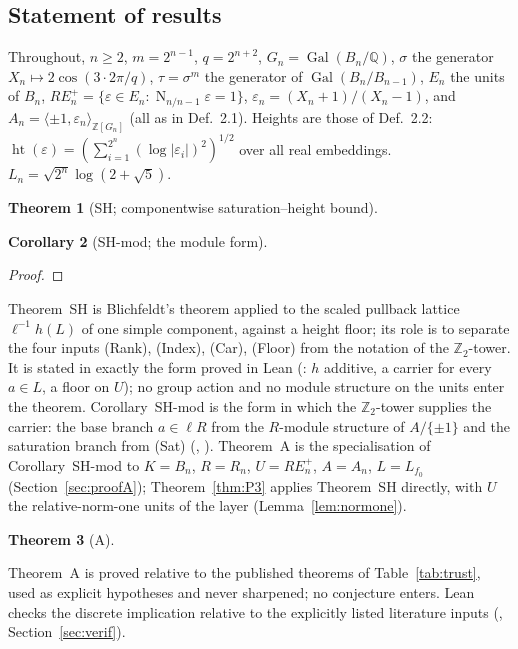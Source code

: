 \documentclass[11pt]{amsart}
\newtheorem{theorem}{Theorem}[section]
\newtheorem{corollary}[theorem]{Corollary}
\theoremstyle{remark}\newtheorem{remark}[theorem]{Remark}
\theoremstyle{definition}\newtheorem{definition}[theorem]{Definition}
\newcommand{\Q}{\mathbb{Q}}\newcommand{\Z}{\mathbb{Z}}\newcommand{\R}{\mathbb{R}}\newcommand{\F}{\mathbb{F}}
\newcommand{\RE}{RE^{+}_n}\newcommand{\ord}{\operatorname{ord}}\newcommand{\hgt}{\operatorname{ht}}
\newcommand{\Nr}{\operatorname{N}_{n/n-1}}\newcommand{\covol}{\operatorname{covol}}
\providecommand{\proofsdir}{../../proofs} %
\begin{document}
\subsection{Statement of results}\label{sec:results}
Throughout, $n\ge2$, $m=2^{n-1}$, $q=2^{n+2}$, $G_n=\operatorname{Gal}(B_n/\Q)$, $\sigma$ the generator $X_n\mapsto2\cos(3\cdot2\pi/q)$, $\tau=\sigma^{m}$ the generator of $\operatorname{Gal}(B_n/B_{n-1})$, $E_n$ the units of $B_n$, $\RE=\{\varepsilon\in E_n:\Nr\varepsilon=1\}$, $\varepsilon_n=(X_n+1)/(X_n-1)$, and $A_n=\langle\pm1,\varepsilon_n\rangle_{\Z[G_n]}$ (all as in \cite{KY} Def.~2.1). Heights are those of \cite{MO16} Def.~2.2: $\hgt(\varepsilon)=(\sum_{i=1}^{2^n}(\log|\varepsilon_i|)^2)^{1/2}$ over all real embeddings. $L_n=\sqrt{2^n}\log(2+\sqrt5)$.

\begin{theorem}[SH; componentwise saturation--height bound]\label{thm:SH}

\end{theorem}
\begin{corollary}[SH-mod; the module form]\label{cor:SHmod}

\end{corollary}
\begin{proof}

\end{proof}
Theorem~SH is Blichfeldt's theorem applied to the scaled pullback lattice $\ell^{-1}h(L)$ of one simple component, against a height floor; its role is to separate the four inputs (Rank), (Index), (Car), (Floor) from the notation of the $\Z_2$-tower. It is stated in exactly the form proved in Lean (: $h$ additive, a carrier for every $a\in L$, a floor on $U$); no group action and no module structure on the units enter the theorem. Corollary~SH-mod is the form in which the $\Z_2$-tower supplies the carrier: the base branch $a\in\ell R$ from the $R$-module structure of $A/\{\pm1\}$ and the saturation branch from (Sat) (, ). Theorem~A is the specialisation of Corollary~SH-mod to $K=B_n$, $R=R_n$, $U=\RE$, $A=A_n$, $L=L_{f_0}$ (Section~\ref{sec:proofA}); Theorem~\ref{thm:P3} applies Theorem~SH directly, with $U$ the relative-norm-one units of the layer (Lemma~\ref{lem:normone}).
\begin{theorem}[A]\label{thm:A}

\end{theorem}
Theorem~A is proved relative to the published theorems of Table~\ref{tab:trust}, used as explicit hypotheses and never sharpened; no conjecture enters. Lean checks the discrete implication relative to the explicitly listed literature inputs (, Section~\ref{sec:verif}).
\end{document}
